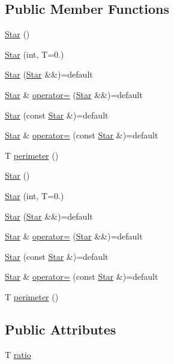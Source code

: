 \subsection*{Public Member Functions}
\begin{DoxyCompactItemize}
\item 
\mbox{\hyperlink{classStar_a4be07c82320f781071409294614df4ae}{Star}} ()
\item 
\mbox{\hyperlink{classStar_aa179936ed93e38e70992cb4f6e3cbff3}{Star}} (int, T=0.)
\item 
\mbox{\hyperlink{classStar_af518471484341cad6b47ad42d4e637fe}{Star}} (\mbox{\hyperlink{classStar}{Star}} \&\&)=default
\item 
\mbox{\hyperlink{classStar}{Star}} \& \mbox{\hyperlink{classStar_a7113d2808314f0aa2f5a87325f8c535d}{operator=}} (\mbox{\hyperlink{classStar}{Star}} \&\&)=default
\item 
\mbox{\hyperlink{classStar_a047ce2a8d4fb409858555aee98b33c93}{Star}} (const \mbox{\hyperlink{classStar}{Star}} \&)=default
\item 
\mbox{\hyperlink{classStar}{Star}} \& \mbox{\hyperlink{classStar_a3507f157448e082ccfcadc4783f2610e}{operator=}} (const \mbox{\hyperlink{classStar}{Star}} \&)=default
\item 
T \mbox{\hyperlink{classStar_a908253192d0b1fe95aeeaa81322545bf}{perimeter}} ()
\item 
\mbox{\hyperlink{classStar_a4be07c82320f781071409294614df4ae}{Star}} ()
\item 
\mbox{\hyperlink{classStar_aa179936ed93e38e70992cb4f6e3cbff3}{Star}} (int, T=0.)
\item 
\mbox{\hyperlink{classStar_af518471484341cad6b47ad42d4e637fe}{Star}} (\mbox{\hyperlink{classStar}{Star}} \&\&)=default
\item 
\mbox{\hyperlink{classStar}{Star}} \& \mbox{\hyperlink{classStar_a7113d2808314f0aa2f5a87325f8c535d}{operator=}} (\mbox{\hyperlink{classStar}{Star}} \&\&)=default
\item 
\mbox{\hyperlink{classStar_a047ce2a8d4fb409858555aee98b33c93}{Star}} (const \mbox{\hyperlink{classStar}{Star}} \&)=default
\item 
\mbox{\hyperlink{classStar}{Star}} \& \mbox{\hyperlink{classStar_a3507f157448e082ccfcadc4783f2610e}{operator=}} (const \mbox{\hyperlink{classStar}{Star}} \&)=default
\item 
T \mbox{\hyperlink{classStar_a908253192d0b1fe95aeeaa81322545bf}{perimeter}} ()
\end{DoxyCompactItemize}
\subsection*{Public Attributes}
\begin{DoxyCompactItemize}
\item 
T \mbox{\hyperlink{classStar_a349e0820769da7e4f76aea0ad6002bf8}{ratio}}
\end{DoxyCompactItemize}
